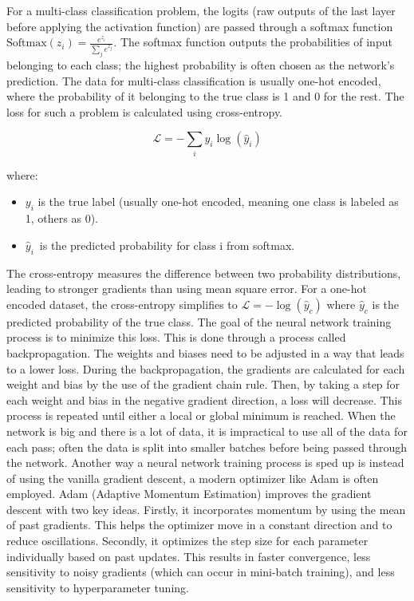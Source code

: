\bigskip \noindent
For a multi-class classification problem, the logits (raw outputs of the last layer before applying the activation function) are passed through a softmax function $\text{Softmax}(z_i) = \frac{e^{z_i}}{\sum_{j} e^{z_j}}$. The softmax function outputs the probabilities of input belonging to each class; the highest probability is often chosen as the network's prediction. The data for multi-class classification is usually one-hot encoded, where the probability of it belonging to the true class is 1 and 0 for the rest. The loss for such a problem is calculated using cross-entropy.

\[
\mathcal{L} = - \sum_{i} y_i \log(\hat{y}_i)
\]

\noindent
where:
\begin{itemize}
\item \( y_i \) is the true label (usually one-hot encoded, meaning one class is labeled as 1, others as 0).
\item \( \hat{y}_i \) is the predicted probability for class i from softmax.
\end{itemize}

\noindent
The cross-entropy measures the difference between two probability distributions, leading to stronger gradients than using mean square error. For a one-hot encoded dataset, the cross-entropy simplifies to $\mathcal{L} = - \log(\hat{y}_{c})$ where $\hat{y}_c$ is the predicted probability of the true class. The goal of the neural network training process is to minimize this loss. This is done through a process called backpropagation. The weights and biases need to be adjusted in a way that leads to a lower loss. During the backpropagation, the gradients are calculated for each weight and bias by the use of the gradient chain rule. Then, by taking a step for each weight and bias in the negative gradient direction, a loss will decrease. This process is repeated until either a local or global minimum is reached. When the network is big and there is a lot of data, it is impractical to use all of the data for each pass; often the data is split into smaller batches before being passed through the network. Another way a neural network training process is sped up is instead of using the vanilla gradient descent, a modern optimizer like Adam is often employed. Adam (Adaptive Momentum Estimation) improves the gradient descent with two key ideas. Firstly, it incorporates momentum by using the mean of past gradients. This helps the optimizer move in a constant direction and to reduce oscillations. Secondly, it optimizes the step size for each parameter individually based on past updates. This results in faster convergence, less sensitivity to noisy gradients (which can occur in mini-batch training), and less sensitivity to hyperparameter tuning.

